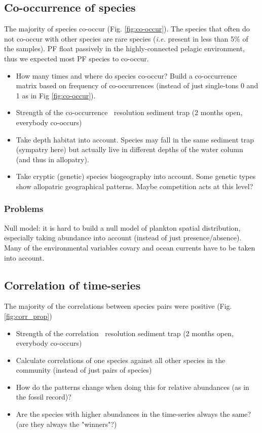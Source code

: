 
\subsection{Co-occurrence of species}

The majority of species co-occur (Fig. \ref{fig:co-occur}). The species that often do not co-occur with other species are rare species (\textit{i.e.} present in less than 5\% of the samples). PF float passively in the highly-connected pelagic environment, thus we expected most PF species to co-occur.

\begin{itemize}
\item How many times and where do species co-occur? Build a co-occurrence matrix based on frequency of co-occurrences (instead of just single-tons 0 and 1 as in Fig \ref{fig:co-occur}).
\item Strength of the co-occurrence $~$ resolution sediment trap (2 months open, everybody co-occurs)
\item Take depth habitat into account. Species may fall in the same sediment trap (sympatry here) but actually live in different depths of the water column (and thus in allopatry).
\item Take cryptic (genetic) species biogeography into account. Some genetic types show allopatric geographical patterns. Maybe competition acts at this level?
\end{itemize}

\subsubsection{Problems}
Null model: it is hard to build a null model of plankton spatial distribution, especially taking abundance into account (instead of just presence/absence). Many of the environmental variables covary and ocean currents have to be taken into account.



\subsection{Correlation of time-series}

The majority of the correlations between species pairs were positive (Fig. \ref{fig:corr_prop})

\begin{itemize}
\item Strength of the correlation $~$ resolution sediment trap (2 months open, everybody co-occurs)
\item Calculate correlations of one species against all other species in the community (instead of just pairs of species)
\item How do the patterns change when doing this for relative abundances (as in the fossil record)? 
\item Are the species with higher abundances in the time-series always the same? (are they always the "winners"?)
\end{itemize}


